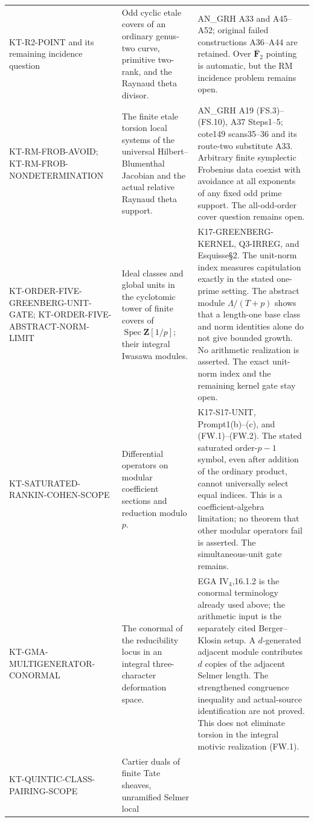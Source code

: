 \begin{longtable}{>{\raggedright\arraybackslash}p{}
>{\raggedright\arraybackslash}p{}
>{\raggedright\arraybackslash}p{}}
KT-R2-POINT and its remaining incidence question &
Odd cyclic etale covers of an ordinary genus-two curve,
primitive two-rank, and the Raynaud theta divisor. &
AN\_GRH A33 and A45--A52; original failed constructions
A36--A44 are retained. Over $\overline{\mathbf F}_2$ pointing
is automatic, but the RM incidence problem remains open.\\
KT-RM-FROB-AVOID; KT-RM-FROB-NONDETERMINATION &
The finite etale torsion local systems of the universal
Hilbert--Blumenthal Jacobian and the actual relative
Raynaud theta support. &
AN\_GRH A19 (FS.3)--(FS.10), A37 Steps1--5;
cote149 scans35--36 and its route-two substitute A33.
Arbitrary finite symplectic Frobenius data coexist with
avoidance at all exponents of any fixed odd prime support.
The all-odd-order cover question remains open.\\
KT-ORDER-FIVE-GREENBERG-UNIT-GATE;
KT-ORDER-FIVE-ABSTRACT-NORM-LIMIT &
Ideal classes and global units in the cyclotomic tower of
finite covers of $\operatorname{Spec}\mathbf Z[1/p]$;
their integral Iwasawa modules. &
K17-GREENBERG-KERNEL, Q3-IRREG, and Esquisse\S2.
The unit-norm index measures capitulation exactly in the stated
one-prime setting. The abstract module $\Lambda/(T+p)$
shows that a length-one base class and norm identities alone
do not give bounded growth. No arithmetic realization is asserted.
The exact unit-norm index and the remaining kernel gate stay open.\\
KT-SATURATED-RANKIN-COHEN-SCOPE &
Differential operators on modular coefficient sections and
reduction modulo $p$. &
K17-S17-UNIT, Prompt1(b)--(c), and (FW.1)--(FW.2).
The stated saturated order-$p-1$ symbol, even after addition
of the ordinary product, cannot universally select equal indices.
This is a coefficient-algebra limitation; no theorem that other
modular operators fail is asserted. The simultaneous-unit gate remains.\\
KT-GMA-MULTIGENERATOR-CONORMAL &
The conormal of the reducibility locus in an integral
three-character deformation space. &
EGA IV$_4$,16.1.2 is the conormal terminology already used above;
the arithmetic input is the separately cited Berger--Klosin setup.
A $d$-generated adjacent module contributes $d$ copies of the
adjacent Selmer length. The strengthened congruence inequality
and actual-source identification are not proved. This does not
eliminate torsion in the integral motivic realization (FW.1).\\
KT-QUINTIC-CLASS-PAIRING-SCOPE &
Cartier duals of finite Tate sheaves, unramified Selmer local

\end{longtable}
